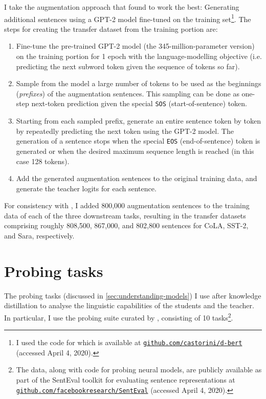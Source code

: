 \documentclass[bsc,frontabs,twoside,singlespacing,parskip,deptreport]{infthesis}
\newcommand\rurl[1]{%
  \href{https://#1}{\nolinkurl{#1}}%
}
\begin{document}
{{    I take the augmentation approach that \citeauthor{Tang_2019b} found to work the best: Generating additional sentences using a GPT-2 model \citep{Radford_2019} fine-tuned on the training set\footnote{I used the code for \citet{Tang_2019b} which is available at \rurl{github.com/castorini/d-bert} (accessed April 4, 2020).}. The steps for creating the transfer dataset from the training portion are:
    \begin{enumerate}
      \item Fine-tune the pre-trained GPT-2 model (the 345-million-parameter version) on the training portion for 1 epoch with the language-modelling objective (i.e. predicting the next subword token given the sequence of tokens so far).
      \item Sample from the model a large number of tokens to be used as the beginnings (\textit{prefixes}) of the augmentation sentences. This sampling can be done as one-step next-token prediction given the special \verb|SOS| (start-of-sentence) token.
      \item Starting from each sampled prefix, generate an entire sentence token by token by repeatedly predicting the next token using the GPT-2 model. The generation of a sentence stops when the special \verb|EOS| (end-of-sentence) token is generated or when the desired maximum sequence length is reached (in this case 128 tokens).
      \item Add the generated augmentation sentences to the original training data, and generate the teacher logits for each sentence.
    \end{enumerate}

    For consistency with \citet{Tang_2019b}, I added 800,000 augmentation sentences to the training data of each of the three downstream tasks, resulting in the transfer datasets comprising roughly 808,500, 867,000, and 802,800 sentences for CoLA, SST-2, and Sara, respectively.
  }

  \section{Probing tasks}{
    The probing tasks (discussed in \autoref{sec:understanding-models}) I use after knowledge distillation to analyse the linguistic capabilities of the students and the teacher. In particular, I use the probing suite curated by \citet{Conneau_2018}, consisting of 10 tasks\footnote{The data, along with code for probing neural models, are publicly available as part of the SentEval toolkit for evaluating sentence representations \citep{SentEval-paper} at \rurl{github.com/facebookresearch/SentEval} (accessed April 4, 2020).}.

}}
\end{document}
